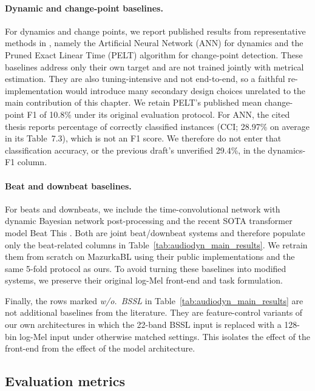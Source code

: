 \paragraph{Dynamic and change-point baselines.}
For dynamics and change points, we report published results from representative methods in \cite{kosta2017thesis}, namely the Artificial Neural Network (ANN) for dynamics and the Pruned Exact Linear Time (PELT) algorithm for change-point detection. These baselines address only their own target and are not trained jointly with metrical estimation. They are also tuning-intensive and not end-to-end, so a faithful re-implementation would introduce many secondary design choices unrelated to the main contribution of this chapter. We retain PELT's published mean change-point F1 of 10.8\% under its original evaluation protocol. For ANN, the cited thesis reports percentage of correctly classified instances (CCI; 28.97\% on average in its Table~7.3), which is not an F1 score. We therefore do not enter that classification accuracy, or the previous draft's unverified 29.4\%, in the dynamics-F1 column.

\paragraph{Beat and downbeat baselines.}
For beats and downbeats, we include the time-convolutional network with dynamic Bayesian network post-processing \cite{bock2020deconstruct} and the recent SOTA transformer model Beat This \cite{foscarin2024beat}. Both are joint beat/downbeat systems and therefore populate only the beat-related columns in Table~\ref{tab:audiodyn_main_results}. We retrain them from scratch on MazurkaBL using their public implementations and the same 5-fold protocol as ours. To avoid turning these baselines into modified systems, we preserve their original log-Mel front-end and task formulation.

Finally, the rows marked \textit{w/o.\ BSSL} in Table~\ref{tab:audiodyn_main_results} are not additional baselines from the literature. They are feature-control variants of our own architectures in which the 22-band BSSL input is replaced with a 128-bin log-Mel input under otherwise matched settings. This isolates the effect of the front-end from the effect of the model architecture.

\subsection{Evaluation metrics}
\label{ssec:audiodyn_metrics}

